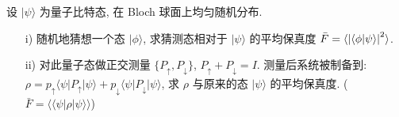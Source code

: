 \documentclass{assignment}
\begin{document}
\begin{probcontinued}{6}
    设 $\lvert\psi\rangle$ 为量子比特态, 在 Bloch 球面上均匀随机分布.
    \begin{itemize}
        \item[i)] 随机地猜想一个态 $\lvert\phi\rangle$, 求猜测态相对于 $\lvert\psi\rangle$ 的平均保真度 $\bar{F}=\langle\left\lvert\langle\phi\vert\psi\rangle\right\rvert^2\rangle$.
        \item[ii)] 对此量子态做正交测量 $\{P_{\uparrow},P_{\downarrow}\}$, $P_{\uparrow}+P_{\downarrow}=I$. 测量后系统被制备到: $\rho=p_{\uparrow}\langle\psi\rvert P_{\uparrow}\lvert\psi\rangle+p_{\downarrow}\langle\psi\rvert P_{\downarrow}\lvert\psi\rangle$, 求 $\rho$ 与原来的态 $\lvert\psi\rangle$ 的平均保真度. ($\bar{F}=\langle\langle\psi\rvert\rho\lvert\psi\rangle\rangle$)
    \end{itemize}
\end{probcontinued}
\end{document}
